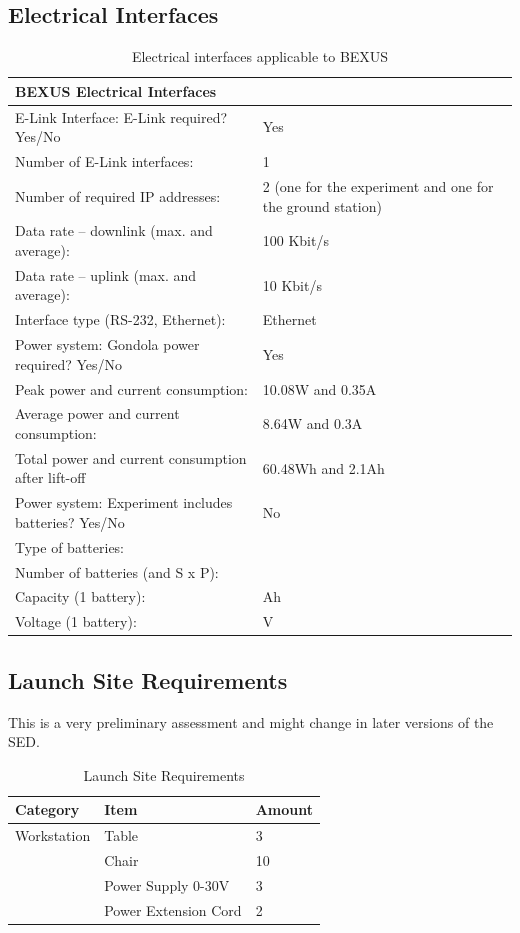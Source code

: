 \documentclass[12pt,a4paper]{report}
\begin{document}
\clearpage

\subsection{Electrical Interfaces}

\begin{table}[h]
\centering
\caption{Electrical interfaces applicable to BEXUS}
\label{tab:electrical_interfaces_bexus}
\begin{tabular}{p{10cm} p{5cm}}
\toprule
\multicolumn{2}{l}{\textbf{BEXUS Electrical Interfaces}} \\
\midrule
E-Link Interface: E-Link required? Yes/No & Yes\\
Number of E-Link interfaces: & 1 \\
Number of required IP addresses: & 2 (one for the experiment and one for the ground station)\\
Data rate -- downlink (max. and average): & 100 Kbit/s \\
Data rate -- uplink (max. and average): & 10 Kbit/s \\
Interface type (RS-232, Ethernet): & Ethernet \\
\midrule
Power system: Gondola power required? Yes/No & Yes\\
Peak power and current consumption: & 10.08W and 0.35A \\
Average power and current consumption: & 8.64W and 0.3A \\
Total power and current consumption after lift-off & 60.48Wh and 2.1Ah \\
\midrule
Power system: Experiment includes batteries? Yes/No & No\\
Type of batteries: & \\
Number of batteries (and S x P): & \\
Capacity (1 battery): & Ah \\
Voltage (1 battery): & V \\
\bottomrule
\end{tabular}
\end{table}
\clearpage

\subsection{Launch Site Requirements}
This is a very preliminary assessment and might change in later versions of the SED.
\begin{table}[h]
\centering
\caption{Launch Site Requirements}
\label{tab:launch_site_req}
\begin{tabular}{lll}
\toprule
\textbf{Category} & \textbf{Item} & \textbf{Amount} \\
\midrule
Workstation&Table & 3 \\
 &Chair & 10 \\
 &Power Supply 0-30V & 3\\
 &Power Extension Cord & 2 \\

\bottomrule
\end{tabular}
\end{table}
\clearpage
\end{document}
